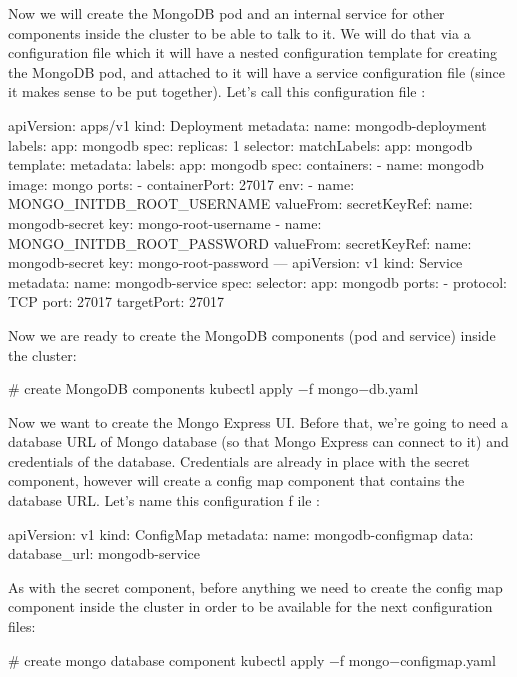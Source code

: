Now we will create the MongoDB pod and an internal service for other components inside the cluster to be able to talk
to it. We will do that via a configuration file which it will have a nested configuration template for creating the
MongoDB pod, and attached to it will have a service configuration file (since it makes sense to be put together). Let's
call this configuration file :
\begin{block}
apiVersion: apps/v1
kind: Deployment
metadata:
  name: mongodb-deployment
  labels:
    app: mongodb
spec:
  replicas: 1
  selector:
    matchLabels:
      app: mongodb
  template:
    metadata:
      labels:
        app: mongodb
    spec:
      containers:
      - name: mongodb
        image: mongo
        ports:
        - containerPort: 27017
        env:
        - name: MONGO_INITDB_ROOT_USERNAME
          valueFrom:
            secretKeyRef:
              name: mongodb-secret
              key: mongo-root-username
        - name: MONGO_INITDB_ROOT_PASSWORD
          valueFrom:
            secretKeyRef:
              name: mongodb-secret
              key: mongo-root-password
---
apiVersion: v1
kind: Service
metadata:
  name: mongodb-service
spec:
  selector:
    app: mongodb
  ports:
    - protocol: TCP
      port: 27017
      targetPort: 27017
\end{block}

Now we are ready to create the MongoDB components (pod and service) inside the cluster:
\begin{bash}
# create MongoDB components
kubectl apply $-$f mongo$-$db.yaml
\end{bash}

Now we want to create the Mongo Express UI. Before that, we're going to need a database URL of Mongo database (so that
Mongo Express can connect to it) and credentials of the database. Credentials are already in place with the secret
component, however will create a config map component that contains the database URL. Let's name this configuration f
ile :
\begin{block}
apiVersion: v1
kind: ConfigMap
metadata:
  name: mongodb-configmap
data:
  database_url: mongodb-service
\end{block}

As with the secret component, before anything we need to create the config map component inside the cluster in order
to be available for the next configuration files:
\begin{bash}
# create mongo database component
kubectl apply $-$f mongo$-$configmap.yaml
\end{bash}

